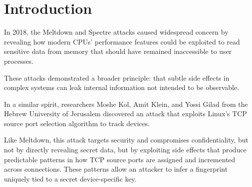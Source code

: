 \documentclass{report}
\begin{document}
\fontsize{8pt}{9pt}\selectfont
{}



\tableofcontents
\thispagestyle{empty}
\clearpage
\pagestyle{plain}

\listoffigures

\clearpage
{}
\pagestyle{default}

\chapter{Introduction}
\label{sec:introduction}

In 2018, the \alert{Meltdown} and \alert{Spectre} attacks caused widespread concern by revealing how modern CPUs’ performance features could be exploited to read sensitive data from memory that should have remained inaccessible to user processes.

These attacks demonstrated a broader principle: that subtle side effects in complex systems can leak internal information not intended to be observable.

In a similar spirit, researchers Moshe Kol, Amit Klein, and Yossi Gilad from the Hebrew University of Jerusalem discovered an attack that exploits Linux’s \alert{TCP source port selection algorithm} to track devices.

Like Meltdown, this attack targets \alert{security} and compromises confidentiality, but not by directly revealing secret data, but by exploiting side effects that produce predictable patterns in how TCP source ports are assigned and incremented across connections. These patterns allow an attacker to infer a fingerprint uniquely tied to a \alert{secret device-specific key}.
\end{document}
